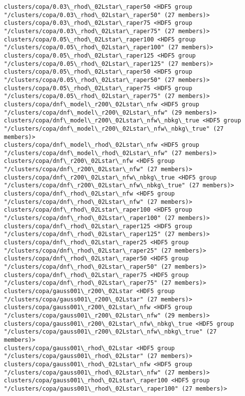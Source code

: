 \documentclass[11pt]{article}
\begin{document}
\begin{Verbatim}[commandchars=\\\{\}]
clusters/copa/0.03\_rhod\_02Lstar\_raper50 <HDF5 group "/clusters/copa/0.03\_rhod\_02Lstar\_raper50" (27 members)>
clusters/copa/0.03\_rhod\_02Lstar\_raper75 <HDF5 group "/clusters/copa/0.03\_rhod\_02Lstar\_raper75" (27 members)>
clusters/copa/0.05\_rhod\_02Lstar\_raper100 <HDF5 group "/clusters/copa/0.05\_rhod\_02Lstar\_raper100" (27 members)>
clusters/copa/0.05\_rhod\_02Lstar\_raper125 <HDF5 group "/clusters/copa/0.05\_rhod\_02Lstar\_raper125" (27 members)>
clusters/copa/0.05\_rhod\_02Lstar\_raper50 <HDF5 group "/clusters/copa/0.05\_rhod\_02Lstar\_raper50" (27 members)>
clusters/copa/0.05\_rhod\_02Lstar\_raper75 <HDF5 group "/clusters/copa/0.05\_rhod\_02Lstar\_raper75" (27 members)>
clusters/copa/dnf\_model\_r200\_02Lstar\_nfw <HDF5 group "/clusters/copa/dnf\_model\_r200\_02Lstar\_nfw" (29 members)>
clusters/copa/dnf\_model\_r200\_02Lstar\_nfw\_nbkg\_true <HDF5 group "/clusters/copa/dnf\_model\_r200\_02Lstar\_nfw\_nbkg\_true" (27 members)>
clusters/copa/dnf\_model\_rhod\_02Lstar\_nfw <HDF5 group "/clusters/copa/dnf\_model\_rhod\_02Lstar\_nfw" (27 members)>
clusters/copa/dnf\_r200\_02Lstar\_nfw <HDF5 group "/clusters/copa/dnf\_r200\_02Lstar\_nfw" (27 members)>
clusters/copa/dnf\_r200\_02Lstar\_nfw\_nbkg\_true <HDF5 group "/clusters/copa/dnf\_r200\_02Lstar\_nfw\_nbkg\_true" (27 members)>
clusters/copa/dnf\_rhod\_02Lstar\_nfw <HDF5 group "/clusters/copa/dnf\_rhod\_02Lstar\_nfw" (27 members)>
clusters/copa/dnf\_rhod\_02Lstar\_raper100 <HDF5 group "/clusters/copa/dnf\_rhod\_02Lstar\_raper100" (27 members)>
clusters/copa/dnf\_rhod\_02Lstar\_raper125 <HDF5 group "/clusters/copa/dnf\_rhod\_02Lstar\_raper125" (27 members)>
clusters/copa/dnf\_rhod\_02Lstar\_raper25 <HDF5 group "/clusters/copa/dnf\_rhod\_02Lstar\_raper25" (27 members)>
clusters/copa/dnf\_rhod\_02Lstar\_raper50 <HDF5 group "/clusters/copa/dnf\_rhod\_02Lstar\_raper50" (27 members)>
clusters/copa/dnf\_rhod\_02Lstar\_raper75 <HDF5 group "/clusters/copa/dnf\_rhod\_02Lstar\_raper75" (27 members)>
clusters/copa/gauss001\_r200\_02Lstar <HDF5 group "/clusters/copa/gauss001\_r200\_02Lstar" (27 members)>
clusters/copa/gauss001\_r200\_02Lstar\_nfw <HDF5 group "/clusters/copa/gauss001\_r200\_02Lstar\_nfw" (29 members)>
clusters/copa/gauss001\_r200\_02Lstar\_nfw\_nbkg\_true <HDF5 group "/clusters/copa/gauss001\_r200\_02Lstar\_nfw\_nbkg\_true" (27 members)>
clusters/copa/gauss001\_rhod\_02Lstar <HDF5 group "/clusters/copa/gauss001\_rhod\_02Lstar" (27 members)>
clusters/copa/gauss001\_rhod\_02Lstar\_nfw <HDF5 group "/clusters/copa/gauss001\_rhod\_02Lstar\_nfw" (27 members)>
clusters/copa/gauss001\_rhod\_02Lstar\_raper100 <HDF5 group "/clusters/copa/gauss001\_rhod\_02Lstar\_raper100" (27 members)>

\end{Verbatim}
\end{document}
